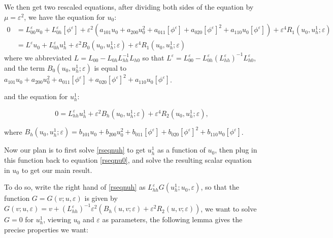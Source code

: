 \documentclass[letterpaper,11pt]{article}
\newcommand{\eps}{\varepsilon}
\numberwithin{equation}{section}
\theoremstyle{plain}
\begin{document}
We then get two rescaled equations, after dividing both sides of the equation by $\mu = \eps^2$, we have the equation for $u_0$: 
\begin{align}
0 &= L_{00}^{\eps}u_0+L_{0h}^{\eps}[\phi^\eps]+\eps^2(a_{101}u_0+a_{200}u_0^2+a_{011}[\phi^\eps]+a_{020}[\phi^\eps]^2+a_{110}u_0[\phi^\eps])+\eps^4R_1(u_0,u_h^1;\eps) \nonumber \\
&=L^\eps u_0 + L_{0h}^\eps u_h^1+\eps^2 B_0(u_0,u_h^1;\eps) +\eps^4 R_1(u_0,u_h^1;\eps) \label{rseqnu0}
\end{align}
where we abbreviated $L = L_{00}-L_{0h}L_{hh}^{-1}L_{h0}$ so that $L^{\eps} = L_{00}^{\eps}-L_{0h}^{\eps}(L_{hh}^{\eps})^{-1}L_{h0}^{\eps}$, and the term $B_0(u_0,u_h^1;\eps)$ is equal to $a_{101}u_0+a_{200}u_0^2+a_{011}[\phi^\eps]+a_{020}[\phi^\eps]^2+a_{110}u_0[\phi^\eps]$.

and the equation for $u_h^1$: 

\begin{equation}\label{rseqnuh}
0 = L_{hh}^{\eps}u_h^1+\eps^2B_h(u_0,u_h^1;\eps)+\eps^4R_2(u_0,u_h^1;\eps),
\end{equation}

where $B_h(u_0,u_h^1;\eps) = b_{101}u_0+b_{200}u_0^2+b_{011}[\phi^\eps] + b_{020}[\phi^\eps]^2+b_{110}u_0[\phi^\eps]$.

Now our plan is to first solve \eqref{rseqnuh} to get $u_h^1$ as a function of $u_0$, then plug in this function back to equation \eqref{rseqnu0}, and solve the resulting scalar equation in $u_0$ to get our main result.

To do so, write the right hand of \eqref{rseqnuh} as $L_{hh}^{\eps}G(u_h^1;u_0,\eps)$, so that the function $G=G(v; u,\eps)$ is given by $G(v; u,\eps) = v+(L_{hh}^{\eps})^{-1}\eps^2(B_h(u,v;\eps)+\eps^2R_2(u,v;\eps))$,  we want to solve $G=0$ for $u_h^1$, viewing $u_0$ and $\eps$ as parameters, the following lemma gives the precise properties we want:
\end{document}
